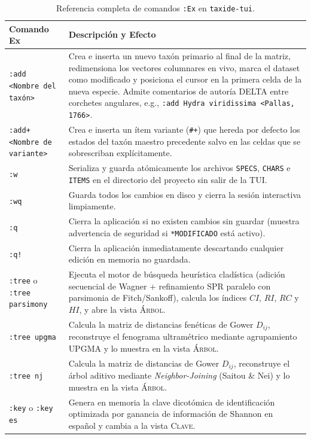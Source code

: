 \documentclass[11pt,a4paper]{article}
\newcommand{\excmd}[1]{\texttt{:#1}}
\begin{document}
\begin{table}[ht]
\centering
\small
\caption{Referencia completa de comandos \texttt{:Ex} en \texttt{taxide-tui}.}
\label{tab:comandos-ex}
\begin{tabularx}{\textwidth}{@{}l X@{}}
\toprule
\textbf{Comando Ex} & \textbf{Descripción y Efecto} \\
\midrule
\excmd{add <Nombre del taxón>} & Crea e inserta un nuevo taxón primario al final de la matriz, redimensiona los vectores columnares en vivo, marca el dataset como modificado y posiciona el cursor en la primera celda de la nueva especie. Admite comentarios de autoría DELTA entre corchetes angulares, e.g., \texttt{:add Hydra viridissima <Pallas, 1766>}. \\
\excmd{add+ <Nombre de variante>} & Crea e inserta un ítem variante (\texttt{\#+}) que hereda por defecto los estados del taxón maestro precedente salvo en las celdas que se sobrescriban explícitamente. \\
\excmd{w} & Serializa y guarda atómicamente los archivos \texttt{SPECS}, \texttt{CHARS} e \texttt{ITEMS} en el directorio del proyecto sin salir de la TUI. \\
\excmd{wq} & Guarda todos los cambios en disco y cierra la sesión interactiva limpiamente. \\
\excmd{q} & Cierra la aplicación si no existen cambios sin guardar (muestra advertencia de seguridad si \texttt{*MODIFICADO} está activo). \\
\excmd{q!} & Cierra la aplicación inmediatamente descartando cualquier edición en memoria no guardada. \\
\excmd{tree} o \excmd{tree parsimony} & Ejecuta el motor de búsqueda heurística cladística (adición secuencial de Wagner + refinamiento SPR paralelo con parsimonia de Fitch/Sankoff), calcula los índices $CI$, $RI$, $RC$ y $HI$, y abre la vista \textsc{Árbol}. \\
\excmd{tree upgma} & Calcula la matriz de distancias fenéticas de Gower $D_{ij}$, reconstruye el fenograma ultramétrico mediante agrupamiento UPGMA y lo muestra en la vista \textsc{Árbol}. \\
\excmd{tree nj} & Calcula la matriz de distancias de Gower $D_{ij}$, reconstruye el árbol aditivo mediante \textit{Neighbor-Joining} (Saitou \& Nei) y lo muestra en la vista \textsc{Árbol}. \\
\excmd{key} o \excmd{key es} & Genera en memoria la clave dicotómica de identificación optimizada por ganancia de información de Shannon en español y cambia a la vista \textsc{Clave}. \\

\end{tabularx}
\end{table}
\end{document}
